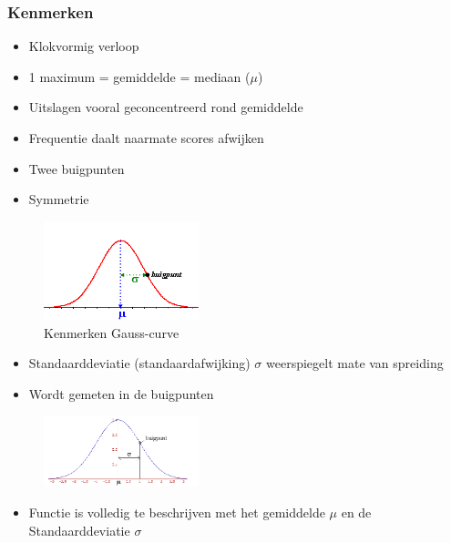 \documentclass{article}
\begin{document}
\subsubsection{Kenmerken}

\begin{itemize}
    \item Klokvormig verloop
    \item 1 maximum = gemiddelde = mediaan ($\mu$)
    \item Uitslagen vooral geconcentreerd rond gemiddelde
    \item Frequentie daalt naarmate scores afwijken
    \item Twee buigpunten
    \item Symmetrie
\end{itemize}

\begin{figure}[H]
    \centering
    \includegraphics[width=0.4\textwidth]{gauss-kenmerken.png}
    \caption{Kenmerken Gauss-curve}
\end{figure}

\begin{itemize}
    \item Standaarddeviatie (standaardafwijking) $\sigma$ weerspiegelt mate van spreiding
    \item Wordt gemeten in de buigpunten
\end{itemize}

\begin{figure}[H]
    \centering
    \includegraphics[width=0.4\textwidth]{gauss-buigpunt.png}
\end{figure}

\begin{itemize}
    \item Functie is volledig te beschrijven met het gemiddelde $\mu$ en de Standaarddeviatie $\sigma$
\end{itemize}
\end{document}
